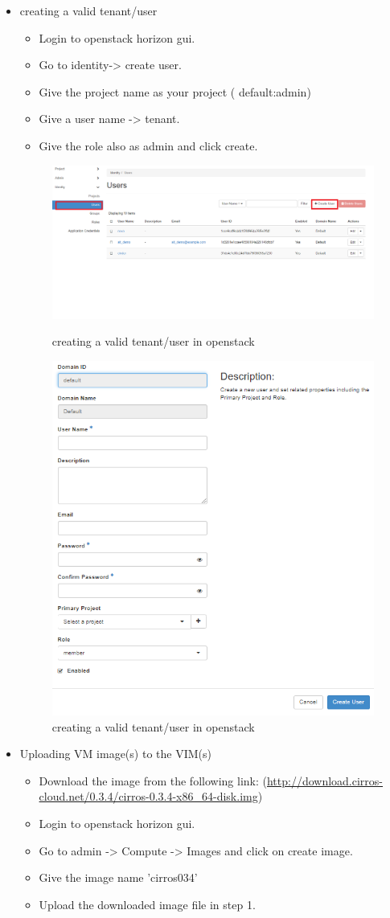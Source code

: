 \begin{itemize}
\item creating a valid tenant/user
\begin{itemize}
\item Login to openstack horizon gui.
\item Go to identity-> create user.
\item Give the project name as your project ( default:admin)
\item Give a user name -> tenant.
\item Give the role also as admin and click create.
\end{itemize}
\begin{figure}[H]
	\centering
	\includegraphics[width=0.5\linewidth]{figures/sh9}
	\caption{creating a valid tenant/user in openstack}
		\includegraphics[width=0.5\linewidth]{figures/sh10}
	\caption{creating a valid tenant/user in openstack}
\end{figure}
\pagebreak
\item Uploading VM image(s) to the VIM(s)
\begin{itemize}
\item Download the image from the following link: (\hyperlink{name}{http://download.cirros-cloud.net/0.3.4/cirros-0.3.4-x86\_64-disk.img})
\item Login to openstack horizon gui.
\item Go to admin -> Compute -> Images and click on create image.
\item Give the image name 'cirros034'
\item Upload the downloaded image file in step 1.

\end{itemize}
\end{itemize}
